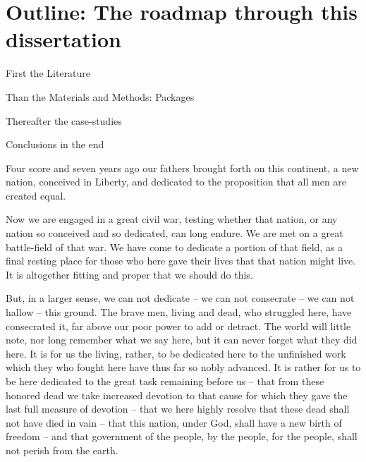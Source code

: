 \section{Outline: The roadmap through this dissertation}
First the Literature

Than the  Materials and Methods: Packages

Thereafter the case-studies

Conclusions in the end

 Four score and seven years ago our fathers brought forth on this continent, a new nation, conceived in Liberty, and dedicated to the proposition that all men are created equal.

Now we are engaged in a great civil war, testing whether that nation, or any nation so conceived and so dedicated, can long endure. We are met on a great battle-field of that war. We have come to dedicate a portion of that field, as a final resting place for those who here gave their lives that that nation might live. It is altogether fitting and proper that we should do this.

But, in a larger sense, we can not dedicate -- we can not consecrate -- we can not hallow -- this ground. The brave men, living and dead, who struggled here, have consecrated it, far above our poor power to add or detract. The world will little note, nor long remember what we say here, but it can never forget what they did here. It is for us the living, rather, to be dedicated here to the unfinished work which they who fought here have thus far so nobly advanced. It is rather for us to be here dedicated to the great task remaining before us -- that from these honored dead we take increased devotion to that cause for which they gave the last full measure of devotion -- that we here highly resolve that these dead shall not have died in vain -- that this nation, under God, shall have a new birth of freedom -- and that government of the people, by the people, for the people, shall not perish from the earth.



